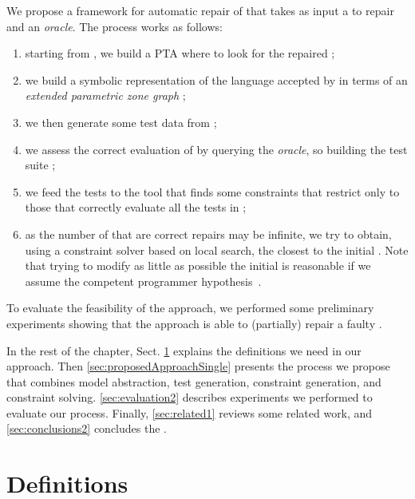 \begin{tikzborder}{\cite{Gargantini16:validation}}
\begin{tikzborder}{\cite{gargantini_combinatorial_2017}}
\begin{tikzborder}{\cite{gargantini_combinatorial_2017}}
\begin{tikzborder}{\cite{garn2019}}
\begin{tikzborder}{\cite{arcaini2019achieving}}
\begin{tikzborder}{\cite{arcaini2019varivolution}}
We propose a framework for automatic repair of \tas that takes as input a \ta \initTa to repair and an {\it oracle}. The process works as follows:
%
\begin{enumerate}
	\item starting from \initTa, we build a PTA \ptaProc where to look for the repaired \ta;
	\item we build a symbolic representation of the language accepted by \ptaProc in terms of an {\it extended parametric zone graph} \epzg;
	\item we then generate some test data \testData from \epzg;
	\item we assess the correct evaluation of \testData by querying the {\it oracle}, so building the test suite \testSuiteTA;
	\item we feed the tests \testSuiteTA to the \imitator tool that finds some constraints \ptaConstr that restrict \ptaProc only to those \tas that correctly evaluate all the tests in \testSuiteTA;
	\item as the number of \tas that are correct repairs may be infinite, we try to obtain, using a constraint solver based on local search, the \ta \repTa closest to the initial \ta \initTa. Note that trying to modify as little as possible the initial \ta is reasonable if we assume the competent programmer hypothesis~\cite{surveyMutationTestingPapadakis2018}.
\end{enumerate}

To evaluate the feasibility of the approach, we performed some preliminary experiments showing that the approach is able to (partially) repair a faulty \ta. 

In the rest of the chapter, Sect. 
\ref{sec:definitions1} explains the definitions we need in our approach.
Then \ref{sec:proposedApproachSingle} presents the process we propose that combines model abstraction, test generation, constraint generation, and constraint solving.
\ref{sec:evaluation2} describes experiments we performed to evaluate our process.
Finally, \ref{sec:related1} reviews some related work, and \ref{sec:conclusions2} concludes the .

\section{Definitions}\label{sec:definitions1}


\end{tikzborder}
\end{tikzborder}
\end{tikzborder}
\end{tikzborder}
\end{tikzborder}
\end{tikzborder}
